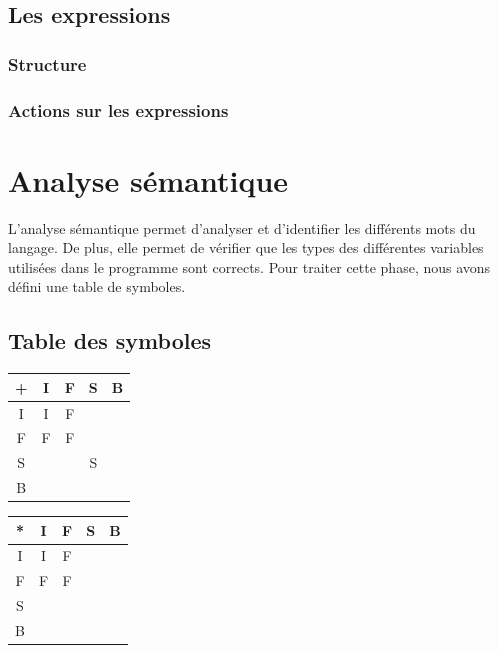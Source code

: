 \documentclass{article}
\begin{document}
\subsection{Les expressions}

\subsubsection*{Structure}

\subsubsection*{Actions sur les expressions}

\section{Analyse sémantique}
L'analyse sémantique permet d'analyser et d'identifier les différents mots du langage. De plus, elle permet de vérifier que les types des différentes variables utilisées dans le programme sont corrects. Pour traiter cette phase, nous avons défini une table de symboles.
 

\subsection{Table des symboles}

\begin{center}
\begin{tabular}{|c|c|c|c|c|}
  \hline
  + & I & F & S & B \\
  \hline
  I & I & F &   &  \\
  \hline
  F & F & F &   & \\
  \hline
  S &   &   & S & \\
  \hline
  B & & & & \\
  \hline
\end{tabular}
\end{center}


\begin{center}
\begin{tabular}{|c|c|c|c|c|}
  \hline
  * & I & F & S & B \\
  \hline
  I & I & F &   &  \\
  \hline
  F & F & F &   & \\
  \hline
  S &   &   &  & \\
  \hline
  B & & & & \\
\hline
\end{tabular}
\end{center}
\end{document}
